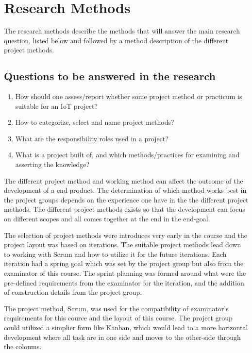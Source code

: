 \section{Research Methods}


The research methods describe the methods that will answer the main research question, listed below and followed by a method description of the different project methods.


\subsection{Questions to be answered in the research}

\begin{enumerate}
    \item{How should one assess/report whether some project method or practicum is suitable for an IoT project?}
    \item{How to categorize, select and name project methods?}
    \item{What are the responsibility roles used in a project?}
    \item{What is a project built of, and which methods/practices for examining and asserting the knowledge?}
\end{enumerate}


The different project method and working method can affect the outcome of the development of a end product.
The determination of which method works best in the project groups depends on the experience one have in the the different project methods. 
The different project methods exists so that the development can focus on different scopes and all comes together at the end in the end-goal.

The selection of project methods were introduces very early in the course and the project layout was based on iterations.
The suitable project methods lead down to working with Scrum\cite{atlassianScrum} and how to utilize it for the future iterations. 
Each iteration had a spring goal which was set by the project group but also from the examinator of this course. 
The sprint planning was formed around what were the pre-defined requirements from the examinator for the iteration, and the addition of construction details from the project group.

The project method, Scrum, was used for the compatibility of examinator's requirements for this cource and the layout of this course.
The project group could utilized a simplier form like Kanban\cite{atlassianKanban}, which would lead to a more horizontal development where all task are in one side and moves to the other-side through the coloums.

